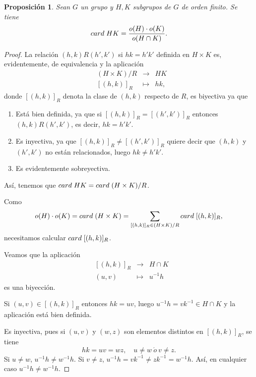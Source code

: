 \documentclass[12pt]{article}
\newtheorem{proposition}[theorem]{Proposición}
\begin{document}
\begin{proposition}Sean $G$ un grupo y $H,K$ subgrupos de $G$ de orden finito. Se tiene $$card \hspace{0.1cm} HK = \dfrac{o(H)\cdot o(K)}{o(H \cap K)}.$$
\end{proposition}
\begin{proof}
La relación $(h,k) R (h',k')$ si $hk = h'k'$ definida en $H \times K$ es, evidentemente, de equivalencia y la aplicación $$
\begin{array}{rccl}
&(H\times K)/R& \longrightarrow &HK\\
&[(h,k)]_R & \longmapsto &hk,
\end{array}
$$ donde $[(h,k)]_R$ denota la clase de $(h,k)$ respecto de $R$, es biyectiva ya que
\begin{enumerate}
\item Está bien definida, ya que si $[(h,k)]_R = [(h',k')]_R$ entonces $(h,k) R(h',k')$, es decir, $hk = h'k'$.
\item Es inyectiva, ya que $[(h,k)]_R \neq [(h',k')]_R$ quiere decir que $(h,k)$ y $(h',k')$ no están relacionados, luego $hk \neq h'k'$.
\item Es evidentemente sobreyectiva.
\end{enumerate}

Así, tenemos que $card \hspace{0.1cm} HK = card \hspace{0.1cm} (H \times K)/R$.

Como $$o(H) \cdot o(K) = card \hspace{0.1cm} (H \times K) = \sum_{[(h,k)]_R \in (H\times K)/R}card\hspace{0.1cm}[(h,k)]_R,$$ necesitamos calcular $card \hspace{0.1cm}[(h,k)]_R$.

Veamos que la aplicación $$
\begin{array}{rccl}
&[(h,k)]_R& \longrightarrow &H\cap K\\
&(u,v)& \longmapsto &u^{-1}h
\end{array}
$$
es una biyección.

Si $(u,v) \in [(h,k)]_R$ entonces $hk = uv$, luego $u^{-1}h = vk^{-1} \in H \cap K$ y la aplicación está bien definida. 

Es inyectiva, pues si $(u,v)$ y $(w,z)$ son elementos distintos en $[(h,k)]_R$, se tiene $$hk = uv = wz, \quad u \neq w~\acute{o}~ v \neq z.$$ 
Si $u \neq w$, $u^{-1}h \neq w^{-1}h$. Si $v \neq z$, $u^{-1}h = vk^{-1} \neq zk^{-1} = w^{-1}h$. Así, en cualquier caso $u^{-1}h \neq w^{-1}h$.


\end{proof}
\end{document}
